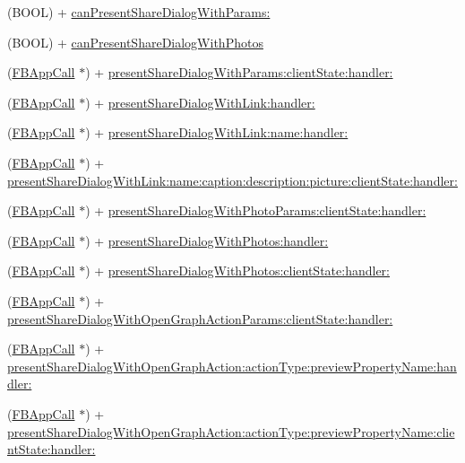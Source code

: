 \begin{DoxyCompactItemize}
(B\+O\+OL) + \hyperlink{interfaceFBDialogs_a36e9e390bb8c6040e6027b647ed587e8}{can\+Present\+Share\+Dialog\+With\+Params\+:}
\item 
(B\+O\+OL) + \hyperlink{interfaceFBDialogs_a16156d6a4664e4ea55e351bc78b6e8a7}{can\+Present\+Share\+Dialog\+With\+Photos}
\item 
(\hyperlink{interfaceFBAppCall}{F\+B\+App\+Call} $\ast$) + \hyperlink{interfaceFBDialogs_aea8f6d762fa50f312e7d574d27439349}{present\+Share\+Dialog\+With\+Params\+:client\+State\+:handler\+:}
\item 
(\hyperlink{interfaceFBAppCall}{F\+B\+App\+Call} $\ast$) + \hyperlink{interfaceFBDialogs_ad3172e31c558d23fd2546e482e6ad76a}{present\+Share\+Dialog\+With\+Link\+:handler\+:}
\item 
(\hyperlink{interfaceFBAppCall}{F\+B\+App\+Call} $\ast$) + \hyperlink{interfaceFBDialogs_a5f935e0fdc377b269f9cf021e242f72e}{present\+Share\+Dialog\+With\+Link\+:name\+:handler\+:}
\item 
(\hyperlink{interfaceFBAppCall}{F\+B\+App\+Call} $\ast$) + \hyperlink{interfaceFBDialogs_aaed28cb89925f451c2d8bab8f1b44e22}{present\+Share\+Dialog\+With\+Link\+:name\+:caption\+:description\+:picture\+:client\+State\+:handler\+:}
\item 
(\hyperlink{interfaceFBAppCall}{F\+B\+App\+Call} $\ast$) + \hyperlink{interfaceFBDialogs_ad8f870b0c951157f3f3c9de5f42031ae}{present\+Share\+Dialog\+With\+Photo\+Params\+:client\+State\+:handler\+:}
\item 
(\hyperlink{interfaceFBAppCall}{F\+B\+App\+Call} $\ast$) + \hyperlink{interfaceFBDialogs_aeaf0798a6057ed03c6a3cc26aa624a27}{present\+Share\+Dialog\+With\+Photos\+:handler\+:}
\item 
(\hyperlink{interfaceFBAppCall}{F\+B\+App\+Call} $\ast$) + \hyperlink{interfaceFBDialogs_abc4827f34c1e7e82b34216e6b9330cd8}{present\+Share\+Dialog\+With\+Photos\+:client\+State\+:handler\+:}
\item 
(\hyperlink{interfaceFBAppCall}{F\+B\+App\+Call} $\ast$) + \hyperlink{interfaceFBDialogs_a2fd765d39b1e4e4a9d4252762694b2b9}{present\+Share\+Dialog\+With\+Open\+Graph\+Action\+Params\+:client\+State\+:handler\+:}
\item 
(\hyperlink{interfaceFBAppCall}{F\+B\+App\+Call} $\ast$) + \hyperlink{interfaceFBDialogs_a17f88dc21a7f13474d310e4dd3e0d781}{present\+Share\+Dialog\+With\+Open\+Graph\+Action\+:action\+Type\+:preview\+Property\+Name\+:handler\+:}
\item 
(\hyperlink{interfaceFBAppCall}{F\+B\+App\+Call} $\ast$) + \hyperlink{interfaceFBDialogs_ad40b913195e68f5449fb0afab6c5a4b5}{present\+Share\+Dialog\+With\+Open\+Graph\+Action\+:action\+Type\+:preview\+Property\+Name\+:client\+State\+:handler\+:}

\end{DoxyCompactItemize}
